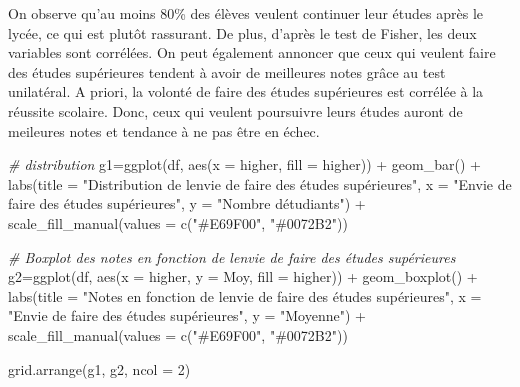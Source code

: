 \documentclass[
]{article}
\newenvironment{Shaded}{\begin{snugshade}}{\end{snugshade}}
\newcommand{\AttributeTok}[1]{\textcolor[rgb]{0.77,0.63,0.00}{#1}}
\newcommand{\CommentTok}[1]{\textcolor[rgb]{0.56,0.35,0.01}{\textit{#1}}}
\newcommand{\DecValTok}[1]{\textcolor[rgb]{0.00,0.00,0.81}{#1}}
\newcommand{\FunctionTok}[1]{\textcolor[rgb]{0.00,0.00,0.00}{#1}}
\newcommand{\NormalTok}[1]{#1}
\newcommand{\OtherTok}[1]{\textcolor[rgb]{0.56,0.35,0.01}{#1}}
\newcommand{\SpecialCharTok}[1]{\textcolor[rgb]{0.00,0.00,0.00}{#1}}
\newcommand{\StringTok}[1]{\textcolor[rgb]{0.31,0.60,0.02}{#1}}
\begin{document}
On observe qu'au moins 80\% des élèves veulent continuer leur études
après le lycée, ce qui est plutôt rassurant. De plus, d'après le test de
Fisher, les deux variables sont corrélées. On peut également annoncer
que ceux qui veulent faire des études supérieures tendent à avoir de
meilleures notes grâce au test unilatéral. A priori, la volonté de faire
des études supérieures est corrélée à la réussite scolaire. Donc, ceux
qui veulent poursuivre leurs études auront de meileures notes et
tendance à ne pas être en échec.

\begin{Shaded}
\begin{Highlighting}[]
\CommentTok{\# distribution}
\NormalTok{g1}\OtherTok{=}\FunctionTok{ggplot}\NormalTok{(df, }\FunctionTok{aes}\NormalTok{(}\AttributeTok{x =}\NormalTok{ higher, }\AttributeTok{fill =}\NormalTok{ higher)) }\SpecialCharTok{+}
  \FunctionTok{geom\_bar}\NormalTok{() }\SpecialCharTok{+}
  \FunctionTok{labs}\NormalTok{(}\AttributeTok{title =} \StringTok{"Distribution de l\textquotesingle{}envie de faire des études supérieures"}\NormalTok{,}
       \AttributeTok{x =} \StringTok{"Envie de faire des études supérieures"}\NormalTok{, }\AttributeTok{y =} \StringTok{"Nombre d\textquotesingle{}étudiants"}\NormalTok{) }\SpecialCharTok{+}
  \FunctionTok{scale\_fill\_manual}\NormalTok{(}\AttributeTok{values =} \FunctionTok{c}\NormalTok{(}\StringTok{"\#E69F00"}\NormalTok{, }\StringTok{"\#0072B2"}\NormalTok{))}

\CommentTok{\# Boxplot des notes en fonction de l\textquotesingle{}envie de faire des études supérieures}
\NormalTok{g2}\OtherTok{=}\FunctionTok{ggplot}\NormalTok{(df, }\FunctionTok{aes}\NormalTok{(}\AttributeTok{x =}\NormalTok{ higher, }\AttributeTok{y =}\NormalTok{ Moy, }\AttributeTok{fill =}\NormalTok{ higher)) }\SpecialCharTok{+}
  \FunctionTok{geom\_boxplot}\NormalTok{() }\SpecialCharTok{+}
  \FunctionTok{labs}\NormalTok{(}\AttributeTok{title =} \StringTok{"Notes en fonction de l\textquotesingle{}envie de faire des études supérieures"}\NormalTok{,}
       \AttributeTok{x =} \StringTok{"Envie de faire des études supérieures"}\NormalTok{, }\AttributeTok{y =} \StringTok{"Moyenne"}\NormalTok{) }\SpecialCharTok{+}
  \FunctionTok{scale\_fill\_manual}\NormalTok{(}\AttributeTok{values =} \FunctionTok{c}\NormalTok{(}\StringTok{"\#E69F00"}\NormalTok{, }\StringTok{"\#0072B2"}\NormalTok{))}

\FunctionTok{grid.arrange}\NormalTok{(g1, g2, }\AttributeTok{ncol =} \DecValTok{2}\NormalTok{)}
\end{Highlighting}
\end{Shaded}
\end{document}

